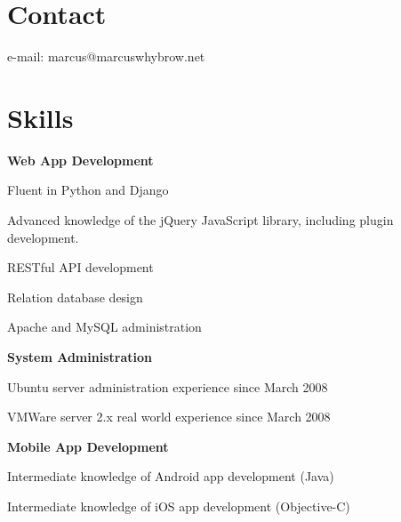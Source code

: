 \documentclass[margin,line]{resume}
\begin{document}
\begin{resume}

    \section{\mysidestyle Contact}

    e-mail: marcus@marcuswhybrow.net      \hfill   \\\vspace{-4.5mm}%


    \section{\mysidestyle Skills}
    
    \textbf{Web App Development}\vspace{-4mm}\\%
    \begin{list2}
		\item Fluent in Python and Django
		\item Advanced knowledge of the jQuery JavaScript library, including plugin development.
		\item RESTful API development
		\item Relation database design
		\item Apache and MySQL administration
    \end{list2}
	
	\textbf{System Administration}\vspace{-4mm}\\%
	\begin{list2}
		\item Ubuntu server administration experience since March 2008
		\item VMWare server 2.x real world experience since March 2008
    \end{list2}
    
	\textbf{Mobile App Development}\vspace{-4mm}\\%
    \begin{list2}
		\item Intermediate knowledge of Android app development (Java)
		\item Intermediate knowledge of iOS app development (Objective-C)
    \end{list2}
    

\end{resume}
\end{document}

